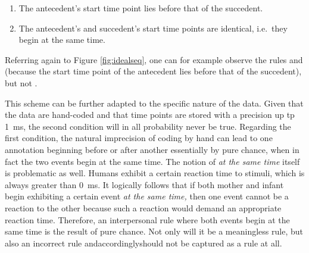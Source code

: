 \begin{enumerate}
	\item The antecedent's start time point lies before that of the succedent.
	\item The antecedent's and succedent's start time points are identical, i.e.\ they begin at the same time.
\end{enumerate}

Referring again to Figure \ref{fig:idealseq}, one can for example observe the rules  and  (because the start time point of the antecedent lies before that of the succedent), but not .

This scheme can be further adapted to the specific nature of the data. Given that the data are hand-coded and that time points are stored with a precision up tp 1~ms, the second condition will in all probability never be true. Regarding the first condition, the natural imprecision of coding by hand can lead to one annotation beginning before or after another essentially by pure chance, when in fact the two events begin at the same time. The notion of \emph{at the same time} itself is problematic as well. Humans exhibit a certain reaction time to stimuli, which is always greater than 0~ms. It logically follows that if both mother and infant begin exhibiting a certain event \emph{at the same time,} then one event cannot be a reaction to the other because such a reaction would demand an appropriate reaction time. Therefore, an interpersonal rule where both events begin at the same time is the result of pure chance. Not only will it be a meaningless rule, but also an incorrect rule and\dash accordingly\dash should not be captured as a rule at all.

